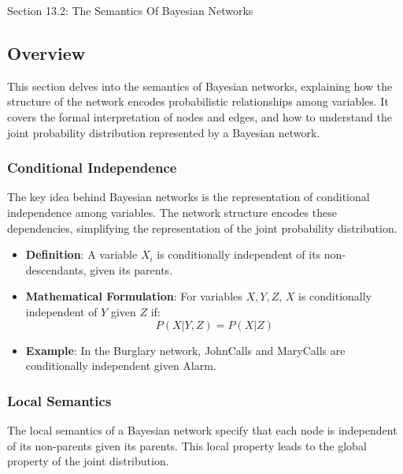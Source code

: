 \begin{notes}{Section 13.2: The Semantics Of Bayesian Networks}
    \subsection*{Overview}

    This section delves into the semantics of Bayesian networks, explaining how the structure of the network encodes probabilistic relationships among variables. It covers the formal interpretation of 
    nodes and edges, and how to understand the joint probability distribution represented by a Bayesian network.
    
    \subsubsection*{Conditional Independence}
    
    The key idea behind Bayesian networks is the representation of conditional independence among variables. The network structure encodes these dependencies, simplifying the representation of the joint 
    probability distribution.
    
    \begin{highlight}
    
        \begin{itemize}
            \item \textbf{Definition}: A variable $X_i$ is conditionally independent of its non-descendants, given its parents.
            \item \textbf{Mathematical Formulation}: For variables $X, Y, Z$, $X$ is conditionally independent of $Y$ given $Z$ if:
            \[
            P(X | Y, Z) = P(X | Z)
            \]
            \item \textbf{Example}: In the Burglary network, JohnCalls and MaryCalls are conditionally independent given Alarm.
        \end{itemize}
    
    \end{highlight}
    
    \subsubsection*{Local Semantics}
    
    The local semantics of a Bayesian network specify that each node is independent of its non-parents given its parents. This local property leads to the global property of the joint distribution.
    

\end{notes}
